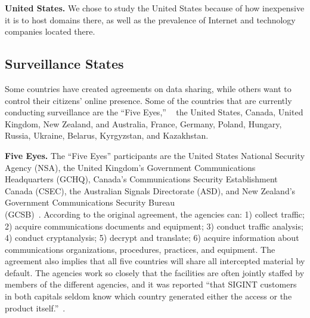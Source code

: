 {\bf United States.}  We chose to study the United States because of how inexpensive it is to host domains there, as well as the prevalence of Internet and technology companies located there.

\subsection{Surveillance States}

Some countries have created agreements on data sharing, while others want to control their citizens' online presence.  Some of the countries that are currently conducting surveillance are the ``Five Eyes,'' ~\cite{lander2004international, eyeswideopen} the United States, Canada, United Kingdom, New Zealand, and Australia, France, Germany, Poland, Hungary, Russia, Ukraine, Belarus, Kyrgyzstan, and Kazakhstan.  

{\bf Five Eyes.} The ``Five Eyes'' participants are the United States National Security Agency (NSA), the United Kingdom's Government Communications Headquarters (GCHQ), Canada's Communications Security Establishment Canada (CSEC), the Australian Signals Directorate (ASD), and New Zealand's Government Communications Security Bureau \\(GCSB)~\cite{eyeswideopen}.  According to the original agreement, the agencies can: 1) collect traffic; 2) acquire communications documents and equipment; 3) conduct traffic analysis; 4) conduct cryptanalysis; 5) decrypt and translate; 6) acquire information about communications organizations, procedures, practices, and equipment.  The agreement also implies that all five countries will share all intercepted material by default.  The agencies work so closely that the facilities are often jointly staffed by members of the different agencies, and it was reported ``that SIGINT customers in both capitals seldom know which country generated either the access or the product itself.''~\cite{lander2004international}.


